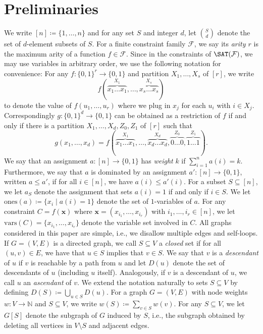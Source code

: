 \documentclass[10pt,a4paper]{article}
\theoremstyle{plain}
\newcommand{\nats}{\mathbb{N}}
\newcommand{\confam}{\mathcal{F}}
\newcommand{\vars}{\mathrm{vars}}
\newcommand{\ones}{\mathrm{ones}}
\newcommand{\entry}[1]{#1 \dots #1}
\begin{document}
\section{Preliminaries}
\label{sec:prelim}
%
We write $[n]\coloneqq \{1,\dots, n\}$ and for any set $S$ and integer $d$, let ${S \choose d}$ denote the set of $d$-element subsets of $S$.
%
For a finite constraint family $\confam$, we say its \emph{arity $r$} is the maximum arity of a function $f\in \confam$. Since in the constraints of $\SAT(\confam)$, we may use variables in arbitrary order, we use the following notation for convenience: For any $f:\{0,1\}^r \to \{0,1\}$ and partition $X_1,\dots, X_s$ of $[r]$, we write  
\[ f(\overbrace{\entry{x_1}}^{X_1},\dots, \overbrace{\entry{x_s}}^{X_s})\]
to denote the value of $f(u_1,\dots,u_r)$ where we plug in $x_j$ for each $u_i$ with $i\in X_j$. Correspondingly $g:\{0,1\}^d \to \{0,1\}$ can be obtained as a restriction of $f$ if and only if there is a partition $X_1,\dots, X_d, Z_0, Z_1$ of $[r]$ such that 
\[ g(x_1,\dots,x_d) = f(\overbrace{\entry{x_1}}^{X_1},\dots, \overbrace{\entry{x_d}}^{X_d}, \overbrace{\entry{0}}^{Z_0}, \overbrace{\entry{1}}^{Z_1}).\]
%
We say that an assignment $a: [n] \to \{0,1\}$ has \emph{weight} $k$ if $\sum_{i=1}^n a(i) = k$. Furthermore, we say that $a$ is dominated by an assignment $a': [n]\to \{0,1\}$, written $a\le a'$, if for all $i\in [n]$, we have $a(i) \le a'(i)$. For a subset $S\subseteq [n]$, we let $a_S$ denote the assignment that sets $a(i)=1$ if and only if $i\in S$. We let $\ones(a) \coloneqq \{ x_i \mid a(i) = 1\}$ denote the set of $1$-variables of $a$. For any constraint $C=f(\mathbf{x})$ where $\mathbf{x} = (x_{i_1},\dots,x_{i_r})$ with $i_1,\dots, i_r\in [n]$, we let $\vars(C) = \{x_{i_1},\dots,x_{i_r}\}$ denote the variable set involved in $C$.
%
%
All graphs considered in this paper are simple, i.e., we disallow multiple edges and self-loops. If $G=(V,E)$ is a directed graph, we call $S\subseteq V$ a \emph{closed} set if for all $(u,v)\in E$, we have that $u\in S$ implies that $v\in S$. We say that $v$ is a \emph{descendant} of $u$ if $v$ is reachable by a path from $u$ and let $D(u)$ denote the set of descendants of $u$ (including $u$ itself). Analogously, if $v$ is a descendant of $u$, we call $u$ an \emph{ascendant} of $v$. We extend the notation naturally to sets $S\subseteq V$ by defining $D(S) \coloneqq \bigcup_{u\in S} D(u)$.
For a graph $G=(V,E)$ with node weights $w: V\to \nats$ and $S\subseteq V$, we write $w(S) \coloneqq \sum_{v\in S}w(v)$. For any $S\subseteq V$, we let $G[S]$ denote the subgraph of $G$ induced by $S$, i.e., the subgraph obtained by deleting all vertices in $V\setminus S$ and adjacent edges.
%
\end{document}
